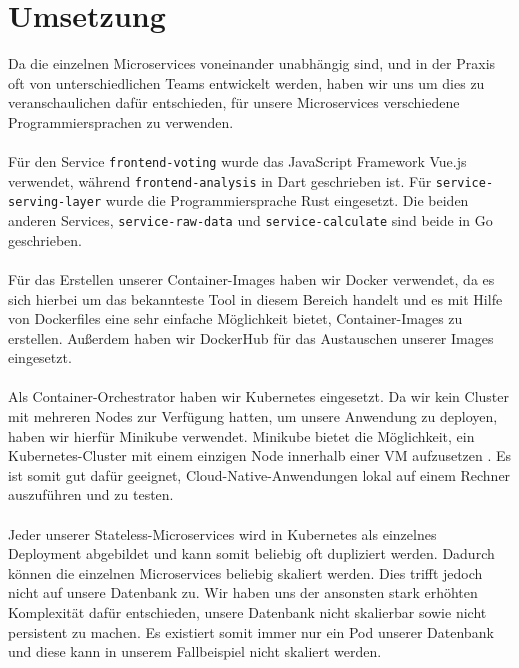 \section{Umsetzung}
Da die einzelnen Microservices voneinander unabhängig sind, und in der Praxis oft von unterschiedlichen Teams entwickelt werden, haben wir uns um dies zu veranschaulichen dafür entschieden, für unsere Microservices verschiedene Programmiersprachen zu verwenden.
\\\\
Für den Service \lstinline{frontend-voting} wurde das JavaScript Framework Vue.js verwendet, während \lstinline{frontend-analysis} in Dart geschrieben ist. Für \lstinline{service-serving-layer} wurde die Programmiersprache Rust eingesetzt. Die beiden anderen Services, \lstinline{service-raw-data} und \lstinline{service-calculate} sind beide in Go geschrieben.
\\\\
Für das Erstellen unserer Container-Images haben wir Docker verwendet, da es sich hierbei um das bekannteste Tool in diesem Bereich handelt und es mit Hilfe von Dockerfiles eine sehr einfache Möglichkeit bietet, Container-Images zu erstellen. Außerdem haben wir DockerHub für das Austauschen unserer Images eingesetzt.
\\\\
Als Container-Orchestrator haben wir Kubernetes eingesetzt. Da wir kein Cluster mit mehreren Nodes zur Verfügung hatten, um unsere Anwendung zu deployen, haben wir hierfür Minikube verwendet. Minikube bietet die Möglichkeit, ein Kubernetes-Cluster mit einem einzigen Node innerhalb einer VM aufzusetzen \cite{noauthor_minikube_2021}. Es ist somit gut dafür geeignet, Cloud-Native-Anwendungen lokal auf einem Rechner auszuführen und zu testen.
\\\\
Jeder unserer Stateless-Microservices wird in Kubernetes als einzelnes Deployment abgebildet und kann somit beliebig oft dupliziert werden. Dadurch können die einzelnen Microservices beliebig skaliert werden. Dies trifft jedoch nicht auf unsere Datenbank zu. Wir haben uns der ansonsten stark erhöhten Komplexität dafür entschieden, unsere Datenbank nicht skalierbar sowie nicht persistent zu machen. Es existiert somit immer nur ein Pod unserer Datenbank und diese kann in unserem Fallbeispiel nicht skaliert werden. 
